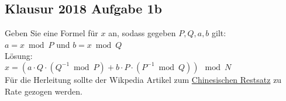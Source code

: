 \documentclass[10pt,a4paper]{article}
\begin{document}
        \subsection{Klausur 2018 Aufgabe 1b}
        Geben Sie eine Formel für \(x\) an, sodass gegeben \(P, Q, a, b\) gilt:\\
        \(a = x \bmod P\) und \(b = x \bmod Q\)\\
        Lösung:\\
        \(x = ( a \cdot Q  \cdot (Q^{-1} \bmod P) + b \cdot P \cdot (P^{-1} \bmod Q)) \mod N\)\\
        Für die Herleitung sollte der Wikpedia Artikel zum
        \href{https://de.wikipedia.org/wiki/Chinesischer_Restsatz}{Chinesischen Restsatz}
        zu Rate gezogen werden.
\end{document}
